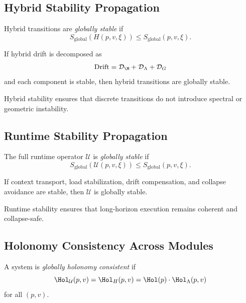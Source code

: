 \documentclass[11pt]{article}
\begin{document}
\subsection{Hybrid Stability Propagation}

\begin{definition}
Hybrid transitions are \emph{globally stable} if
\[
S_{\mathrm{global}}(H(p,v,\xi))
\le S_{\mathrm{global}}(p,v,\xi).
\]
\end{definition}

\begin{lemma}
If hybrid drift is decomposed as
\[
\mathrm{Drift}
= \mathcal{D}_\M + \mathcal{D}_\Lambda + \mathcal{D}_G
\]
and each component is stable, then hybrid transitions are globally stable.
\end{lemma}

\begin{remark}
Hybrid stability ensures that discrete transitions do not introduce
spectral or geometric instability.
\end{remark}

\subsection{Runtime Stability Propagation}

\begin{definition}
The full runtime operator $\mathcal{U}$ is \emph{globally stable} if
\[
S_{\mathrm{global}}(\mathcal{U}(p,v,\xi))
\le S_{\mathrm{global}}(p,v,\xi).
\]
\end{definition}

\begin{lemma}
If context transport, load stabilization, drift compensation, and collapse
avoidance are stable, then $\mathcal{U}$ is globally stable.
\end{lemma}

\begin{remark}
Runtime stability ensures that long-horizon execution remains coherent and
collapse-safe.
\end{remark}

\subsection{Holonomy Consistency Across Modules}

\begin{definition}
A system is \emph{globally holonomy consistent} if
\[
\Hol_{\mathcal{U}}(p,v)
= \Hol_H(p,v)
= \Hol(p) \cdot \Hol_{\Lambda}(p,v)
\]
for all $(p,v)$.
\end{definition}
\end{document}
